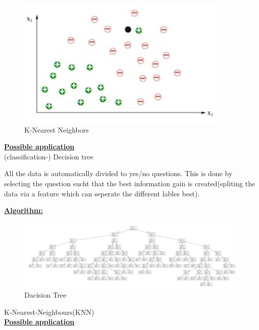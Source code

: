\begin{figure}[hbtp]
	\centering
	\includegraphics[scale=1]{knn2}
	\caption{K-Nearest Neighbors}
	\label{fig:Datensatz - unbearbeitet}
\end{figure}

\textbf{\underline{Possible application}}\\


(classification-) Decision tree

All the data is automatically divided to yes/no questions. This is done by selecting the question sucht that the best information gain is created(spliting the data via a feature which can seperate the different lables best).

\textbf{\underline{Algorithm:}}\\
\begin{figure}[hbtp]
	\centering
	\includegraphics[scale=0.5]{tree}
	\caption{Dacision Tree}
	\label{fig:Datensatz - unbearbeitet}
\end{figure}

K-Nearest-Neighbours(KNN)\\

\textbf{\underline{Possible application}}\\

